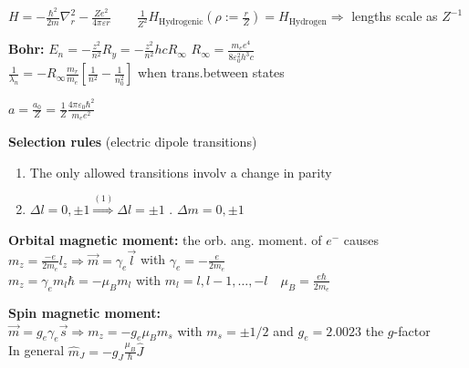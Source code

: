 
\begin{squishlist}
    \item $H = - \frac{\hbar^2}{2m}\nabla^2_r - \frac{Z e^2}{4 \pi \varepsilon r} \qquad  \frac{1}{Z^2}H_{\text{Hydrogenic}}\left(\rho:=\frac{r}{Z}\right) = H_{\text{Hydrogen}} \Longrightarrow$ lengths scale as $Z^{-1}$
    \item \textbf{Bohr:} $E_n = - \frac{z^2}{n^2} R_y = - \frac{z^2}{n^2}h c R_{\infty}$ \quad $R_{\infty} = \frac{m_e e^4}{8 \varepsilon_0^2 h^3 c}$\\
     $\frac{1}{\lambda_n} = - R_{\infty} \frac{m_r}{m_e} \left[ \frac{1}{n^2} - \frac{1}{n_0^2}\right]$ when trans.between states
    
    \item $ a = \frac{a_0}{Z} = \frac{1}{Z} \frac{4\pi \varepsilon_0 \hbar^2}{m_e e^2}$

    \item \textbf{Selection rules} (electric dipole transitions)
        \begin{enumerate}
            \item The only allowed transitions involv a change in parity
            \item $\Delta l = 0, \pm1 \overset{(1)}{\Longrightarrow} \Delta l = \pm 1$ . $\Delta m = 0, \pm 1$
        \end{enumerate}
    
        \item \textbf{Orbital magnetic moment:} the orb. ang. moment. of $e^-$ causes \\
        $m_z = \frac{-e}{2m_e}l_z \Longrightarrow \vec{m} = \gamma_e \vec{l}$ \quad with $\gamma_e = -\frac{e}{2m_e}$\\
        $m_z = \gamma_e m_l \hbar = -\mu_B m_l$ \quad with $m_l = l, l-1, \ldots, -l \quad \mu_B = \frac{e\hbar}{2m_e}$

        \item \textbf{Spin magnetic moment:} \\ $\vec{m} = g_e \gamma_e \vec{s} \Longrightarrow m_z = -g_e \mu_B m_s$ \quad with $m_s=\pm1/2$ and $g_e = 2.0023$ the $g$-factor \\
        In general $\hat{m}_J = - g_J \frac{\mu_B}{\hbar} \hat{J}$
    \end{squishlist} 
    
    \squishline

